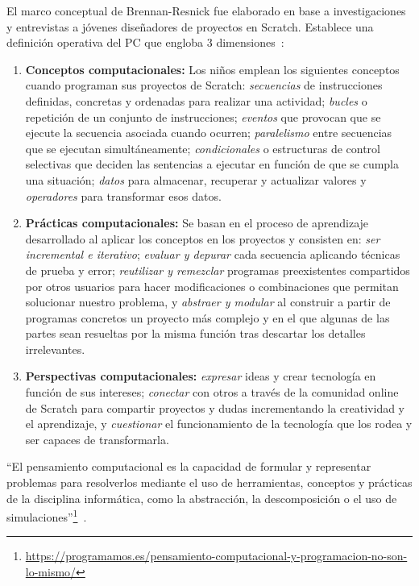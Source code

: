 \documentclass[a4paper, 12pt]{book}
\begin{document}
El marco conceptual de Brennan-Resnick fue elaborado en base a investigaciones y entrevistas a jóvenes diseñadores de proyectos en Scratch. Establece una definición operativa del PC que engloba 3 dimensiones~\cite{brennan2012new}: 
\begin{enumerate}
    \item \textbf{Conceptos computacionales:} Los niños emplean los siguientes conceptos cuando programan sus proyectos de Scratch: \emph{secuencias} de instrucciones definidas, concretas y ordenadas para realizar una actividad; \emph{bucles} o repetición de un conjunto de instrucciones; \emph{eventos} que provocan que se ejecute la secuencia asociada cuando ocurren; \emph{paralelismo} entre secuencias que se ejecutan simultáneamente; \emph{condicionales} o estructuras de control selectivas que deciden las sentencias a ejecutar en función de que se cumpla una situación; \emph{datos} para almacenar, recuperar y actualizar valores y \emph{operadores} para transformar esos datos.  
    \item \textbf{Prácticas computacionales:} Se basan en el proceso de aprendizaje desarrollado al aplicar los conceptos en los proyectos y consisten en: \emph{ser incremental e iterativo}; \emph{evaluar y depurar} cada secuencia aplicando técnicas de prueba y error;
    \emph{reutilizar y remezclar} programas preexistentes compartidos por otros usuarios para hacer modificaciones o combinaciones que permitan solucionar nuestro problema, y \emph{abstraer y modular} al construir a partir de programas concretos un proyecto más complejo y en el que algunas de las partes sean resueltas por la misma función tras descartar los detalles irrelevantes.
    
    \item \textbf{Perspectivas computacionales:} \emph{expresar} ideas y crear tecnología en función de sus intereses; \emph{conectar} con otros a través de la comunidad online de Scratch para compartir proyectos y dudas incrementando la creatividad y el aprendizaje, y \emph{cuestionar} el funcionamiento de la tecnología que los rodea y ser capaces de transformarla.
\end{enumerate} 

``El pensamiento computacional es la capacidad de formular y representar problemas para resolverlos mediante el uso de herramientas, conceptos y prácticas de la disciplina informática, como la abstracción, la descomposición o el uso de simulaciones''\footnote{\url{https://programamos.es/pensamiento-computacional-y-programacion-no-son-lo-mismo/}}~\cite{moreno19programming}.
\end{document}
